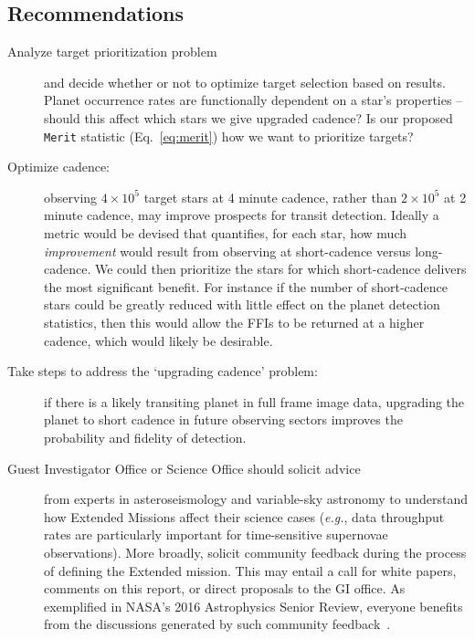 \subsection{Recommendations}
\label{sec:recommendations}
\begin{description}
  
	\item[Analyze target prioritization problem] and decide whether or not to optimize target selection based on results. %
	Planet occurrence rates are functionally dependent on a star's properties -- should this affect which stars we give upgraded cadence?
	Is our proposed \texttt{Merit} statistic (Eq.~\ref{eq:merit}) how we want to prioritize targets?
	
      \item[Optimize cadence:] observing $4\times10^5$ target stars at 
	      4 minute cadence, rather than $2\times10^5$ at 2 minute cadence,
	      may improve prospects for transit detection. 
	      Ideally a metric would be devised that
        quantifies, for each star, how much {\it improvement} would
        result from observing at short-cadence versus long-cadence.
        We could then prioritize the stars for which short-cadence 
        delivers the most significant benefit. 
        For instance if the number of short-cadence stars could be 
        greatly reduced with little effect on the planet detection
        statistics, then this would allow the FFIs to be returned at a
        higher cadence, which would likely be desirable.
	
	\item[Take steps to address the `upgrading cadence' problem:]
          if there is a likely transiting planet in full frame image
          data, upgrading the planet to short cadence in future
          observing sectors improves the probability and fidelity of
          detection.
	
	\item[Guest Investigator Office or \tess Science Office should
          solicit advice] from experts in asteroseismology and
          variable-sky astronomy to understand how Extended Missions
          affect their science cases (\textit{e.g.}, data throughput
          rates are particularly important for time-sensitive
          supernovae observations).  More broadly, solicit community
          feedback during the process of defining the Extended
          mission.  This may entail a call for white papers, comments
          on this report, or direct proposals to the GI office.  As
          exemplified in NASA’s 2016 Astrophysics Senior Review,
          everyone benefits from the discussions generated by such
          community feedback~\citep{donahue_senior_2016}.
	

\end{description}
